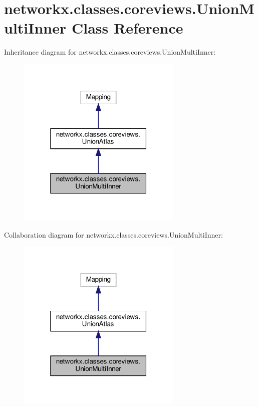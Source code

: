 \hypertarget{classnetworkx_1_1classes_1_1coreviews_1_1UnionMultiInner}{}\section{networkx.\+classes.\+coreviews.\+Union\+Multi\+Inner Class Reference}
\label{classnetworkx_1_1classes_1_1coreviews_1_1UnionMultiInner}


Inheritance diagram for networkx.\+classes.\+coreviews.\+Union\+Multi\+Inner\+:
\nopagebreak
\begin{figure}[H]
\begin{center}
\leavevmode
\includegraphics[width=223pt]{classnetworkx_1_1classes_1_1coreviews_1_1UnionMultiInner__inherit__graph}
\end{center}
\end{figure}


Collaboration diagram for networkx.\+classes.\+coreviews.\+Union\+Multi\+Inner\+:
\nopagebreak
\begin{figure}[H]
\begin{center}
\leavevmode
\includegraphics[width=223pt]{classnetworkx_1_1classes_1_1coreviews_1_1UnionMultiInner__coll__graph}
\end{center}
\end{figure}
